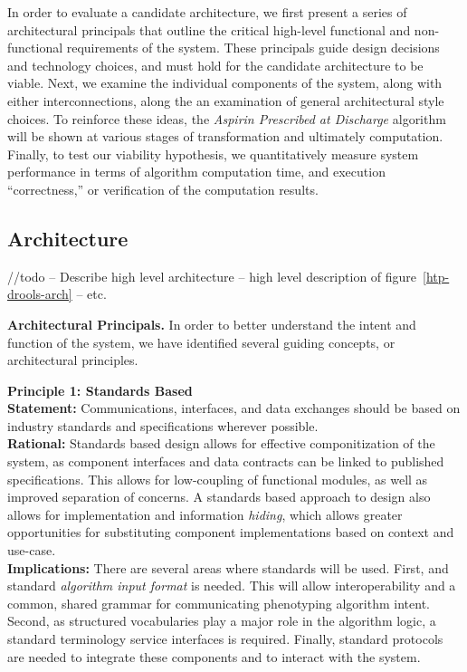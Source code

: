 \documentclass{amia}
\begin{document}
In order to evaluate a candidate architecture, we first present a series of architectural principals that outline the critical high-level functional and non-functional requirements of the system. These principals guide design decisions and technology choices, and must hold for the candidate architecture to be viable. Next, we examine the individual components of the system, along with either interconnections, along the an examination of general architectural style choices. To reinforce these ideas, the \textit{Aspirin Prescribed at Discharge} algorithm will be shown at various stages of transformation and ultimately computation. Finally, to test our viability hypothesis, we quantitatively measure system performance in terms of algorithm computation time, and execution ``correctness,'' or verification of the computation results.

\subsection*{Architecture}
//todo -- Describe high level architecture -- high level description of figure~\ref{htp-drools-arch} -- etc.

\textbf{Architectural Principals.}
In order to better understand the intent and function of the system, we have identified several guiding concepts, or architectural principles\cite{garlan1993introduction}.

\textbf{Principle 1: Standards Based}\\
\textbf{Statement:} Communications, interfaces, and data exchanges should be based on industry standards and specifications wherever possible.\\
\textbf{Rational:} Standards based design allows for effective componitization of the system, as component interfaces and data contracts can be linked to published specifications. This allows for low-coupling of functional modules, as well as improved separation of concerns. A standards based approach to design also allows for implementation and information \textit{hiding}\cite{sullivan2001structure}, which allows greater opportunities for substituting component implementations based on context and use-case.\\
\textbf{Implications:} There are several areas where standards will be used. First, and standard \textit{algorithm input format} is needed. This will allow interoperability and a common, shared grammar for communicating phenotyping algorithm intent. Second, as structured vocabularies play a major role in the algorithm logic, a standard terminology service interfaces is required. Finally, standard protocols are needed to integrate these components and to interact with the system.
\end{document}
